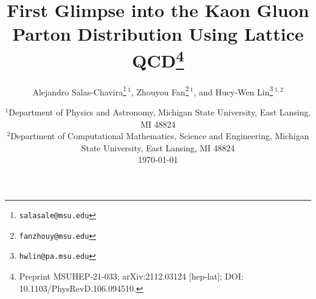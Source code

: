 \documentclass[11pt]{article}
\begin{document}
\title{First Glimpse into the Kaon Gluon Parton Distribution Using
  Lattice QCD\thanks{Preprint MSUHEP-21-033; arXiv:2112.03124
    [hep-lat]; DOI: 10.1103/PhysRevD.106.094510.}}

\author{Alejandro Salas-Chavira\thanks{\texttt{salasale@msu.edu}}\,$^{1}$,\quad
  Zhouyou Fan\thanks{\texttt{fanzhouy@msu.edu}}\,$^{1}$, and\quad
  Huey-Wen Lin\thanks{\texttt{hwlin@pa.msu.edu}}\,$^{1,2}$}

\date{$^{1}$Department of Physics and Astronomy, Michigan State University,
  East Lansing, MI 48824\\[0.3em]
  $^{2}$Department of Computational Mathematics, Science and Engineering,
  Michigan State University, East Lansing, MI 48824\\[0.8em]
  \today}

\maketitle







\end{document}
